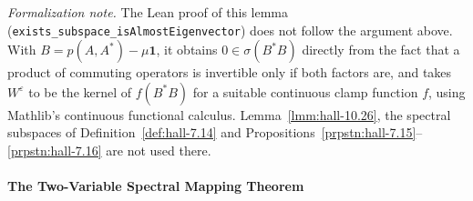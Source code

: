 \noindent\textit{Formalization note.} The Lean proof of this lemma (\texttt{exists\_subspace\_isAlmostEigenvector}) does not follow the argument above. With $B = p(A,A^*) - \mu\mathbf{1}$, it obtains $0 \in \sigma(B^*B)$ directly from the fact that a product of commuting operators is invertible only if both factors are, and takes $W^\varepsilon$ to be the kernel of $f(B^*B)$ for a suitable continuous clamp function $f$, using Mathlib's continuous functional calculus. Lemma~\ref{lmm:hall-10.26}, the spectral subspaces of Definition~\ref{def:hall-7.14} and Propositions~\ref{prpstn:hall-7.15}--\ref{prpstn:hall-7.16} are not used there.

\paragraph{The Two-Variable Spectral Mapping Theorem}\mbox{}\\

